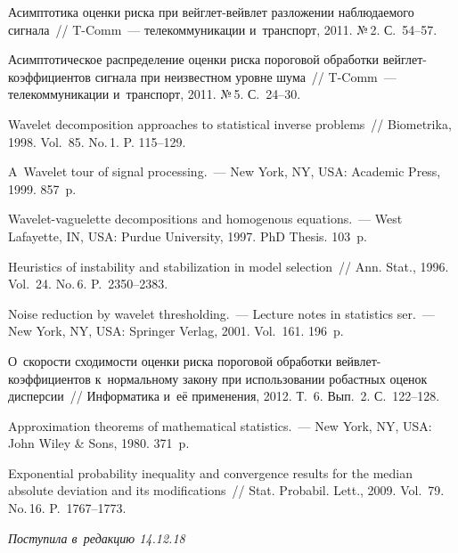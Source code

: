 \begin{multicols}{2}
{{\begin{thebibliography}{99}
Асимптотика оценки риска при вейг\-лет-вейв\-лет разложении наблюдаемого сигнала~// 
T-Comm~--- телекоммуникации и~транспорт, 2011. №\,2. С.~54--57.

Асимптотическое распределение оценки риска пороговой обработки 
вейг\-лет-ко\-эф\-фи\-ци\-ен\-тов сигнала при неизвестном уровне шума~// 
T-Comm~--- телекоммуникации и~транспорт, 2011. №\,5. С.~24--30.

Wavelet decomposition approaches to statistical inverse problems~// 
Biometrika, 1998. Vol.~85. No.\,1. P. 115--129.

 A~Wavelet tour of signal processing.~--- 
New York, NY, USA: Academic Press, 1999. 857~p.

 Wavelet-vaguelette decompositions and homogenous equations.~--- 
West Lafayette, IN, USA: Purdue University, 1997.  PhD Thesis. 103~p.

 Heuristics of instability and stabilization in model selection~// 
Ann. Stat., 1996. Vol.~24. No.\,6. P.~2350--2383.

 Noise reduction by wavelet thresholding.~--- 
Lecture notes in statistics ser.~--- New York, NY, USA: Springer Verlag,
2001. Vol.~161. 196~p.

 О~скорости сходимости оценки риска пороговой обработки 
вейв\-лет-ко\-эф\-фи\-ци\-ен\-тов к~нормальному закону при использовании 
робастных оценок дисперсии~// Информатика и~её применения, 2012. Т.~6. Вып.~2. 
С.~122--128.

 Approximation theorems of mathematical statistics.~--- 
New York, NY, USA: John Wiley \& Sons, 1980. 371~p.

Exponential probability inequality and convergence results for the median 
absolute deviation and its modifications~// Stat. Probabil. Lett., 2009. 
Vol.~79. No.\,16. P.~1767--1773.
 \end{thebibliography}

 }
 }

\end{multicols}

\vspace*{-3pt}

\hfill{\small\textit{Поступила в~редакцию 14.12.18}}

